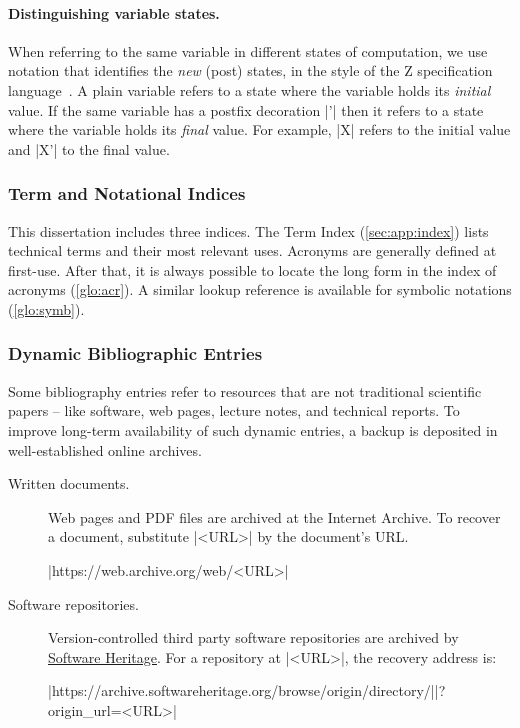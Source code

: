 \paragraph*{Distinguishing variable states.}
When referring to the same variable in different states of computation, we use notation that identifies the \emph{new} (post) states,
in the style of the Z specification language~\cite{spivey1992}.
A plain variable refers to a state where the variable holds its \emph{initial} value.
If the same variable has a postfix decoration \pr|'| then it refers to a state where the variable holds its \emph{final} value.
For example, \pr|X| refers to the initial value and \pr|X'| to the final value.

\subsubsection{Term and Notational Indices}

This dissertation includes three indices.
The Term Index (\autoref{sec:app:index}) lists technical terms and their most relevant uses.
Acronyms are generally defined at first-use.
After that, it is always possible to locate the long form in the index of acronyms (\autoref{glo:acr}).
A similar lookup reference is available for symbolic notations (\autoref{glo:symb}).

\subsubsection{Dynamic Bibliographic Entries}

Some bibliography entries refer to resources that are not traditional scientific papers --
like software, web pages, lecture notes, and technical reports.
To improve long-term availability of such dynamic entries, a backup is deposited in well-established online archives.

\begin{description}
\item[Written documents.]
Web pages and PDF files are archived at the Internet Archive.
To recover a document, substitute \pr|<URL>| by the document's URL.
\begin{center}\pr|https://web.archive.org/web/<URL>|\end{center}

\item[Software repositories.]
Version-controlled third party software repositories are archived by \href{https://softwareheritage.org/}{Software Heritage}.
For a repository at \pr|<URL>|, the recovery address is:%
\begin{center}\pr|https://archive.softwareheritage.org/browse/origin/directory/|\mbox{\pr|?origin_url=<URL>|}\end{center}
\end{description}

